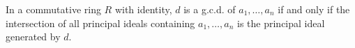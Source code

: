 In a commutative ring $R$ with identity, $d$ is a g.c.d. of $a_1, \ldots, a_n$ if and only if the intersection of all principal ideals containing $a_1, \ldots, a_n$ is the principal ideal generated by $d$.
